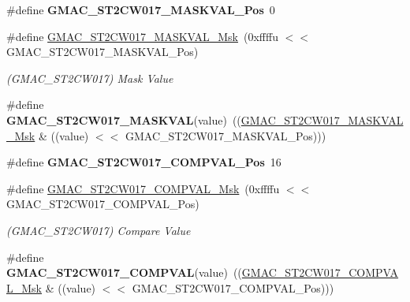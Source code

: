 \begin{DoxyCompactItemize}
\#define {\bfseries G\+M\+A\+C\+\_\+\+S\+T2\+C\+W017\+\_\+\+M\+A\+S\+K\+V\+A\+L\+\_\+\+Pos}~0
\item 
\mbox{\label{group__SAME70__GMAC_ga8400a07b92154c52704ccddb7feeb480}} 
\#define \mbox{\hyperlink{group__SAME70__GMAC_ga8400a07b92154c52704ccddb7feeb480}{G\+M\+A\+C\+\_\+\+S\+T2\+C\+W017\+\_\+\+M\+A\+S\+K\+V\+A\+L\+\_\+\+Msk}}~(0xffffu $<$$<$ G\+M\+A\+C\+\_\+\+S\+T2\+C\+W017\+\_\+\+M\+A\+S\+K\+V\+A\+L\+\_\+\+Pos)
\begin{DoxyCompactList}\small\item\em (G\+M\+A\+C\+\_\+\+S\+T2\+C\+W017) Mask Value \end{DoxyCompactList}\item 
\mbox{\label{group__SAME70__GMAC_ga0388c54b60fcdcd56d7dd09fa82a135d}} 
\#define {\bfseries G\+M\+A\+C\+\_\+\+S\+T2\+C\+W017\+\_\+\+M\+A\+S\+K\+V\+AL}(value)~((\mbox{\hyperlink{group__SAMV71__GMAC_ga8400a07b92154c52704ccddb7feeb480}{G\+M\+A\+C\+\_\+\+S\+T2\+C\+W017\+\_\+\+M\+A\+S\+K\+V\+A\+L\+\_\+\+Msk}} \& ((value) $<$$<$ G\+M\+A\+C\+\_\+\+S\+T2\+C\+W017\+\_\+\+M\+A\+S\+K\+V\+A\+L\+\_\+\+Pos)))
\item 
\mbox{\label{group__SAME70__GMAC_gae4e6d9115273e9545a1f372151954738}} 
\#define {\bfseries G\+M\+A\+C\+\_\+\+S\+T2\+C\+W017\+\_\+\+C\+O\+M\+P\+V\+A\+L\+\_\+\+Pos}~16
\item 
\mbox{\label{group__SAME70__GMAC_gad131941a07f49beb389317d263ae04b8}} 
\#define \mbox{\hyperlink{group__SAME70__GMAC_gad131941a07f49beb389317d263ae04b8}{G\+M\+A\+C\+\_\+\+S\+T2\+C\+W017\+\_\+\+C\+O\+M\+P\+V\+A\+L\+\_\+\+Msk}}~(0xffffu $<$$<$ G\+M\+A\+C\+\_\+\+S\+T2\+C\+W017\+\_\+\+C\+O\+M\+P\+V\+A\+L\+\_\+\+Pos)
\begin{DoxyCompactList}\small\item\em (G\+M\+A\+C\+\_\+\+S\+T2\+C\+W017) Compare Value \end{DoxyCompactList}\item 
\mbox{\label{group__SAME70__GMAC_gab636070415000f3979e448b0aea742c9}} 
\#define {\bfseries G\+M\+A\+C\+\_\+\+S\+T2\+C\+W017\+\_\+\+C\+O\+M\+P\+V\+AL}(value)~((\mbox{\hyperlink{group__SAMV71__GMAC_gad131941a07f49beb389317d263ae04b8}{G\+M\+A\+C\+\_\+\+S\+T2\+C\+W017\+\_\+\+C\+O\+M\+P\+V\+A\+L\+\_\+\+Msk}} \& ((value) $<$$<$ G\+M\+A\+C\+\_\+\+S\+T2\+C\+W017\+\_\+\+C\+O\+M\+P\+V\+A\+L\+\_\+\+Pos)))

\end{DoxyCompactItemize}
